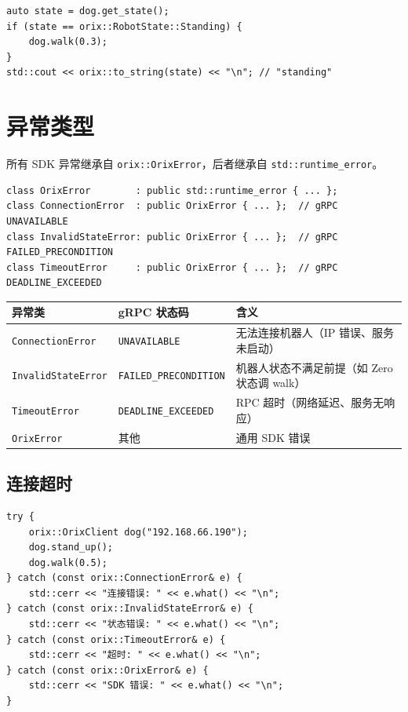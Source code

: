 \documentclass[a4paper,11pt,openany]{book}
\begin{document}
\begin{lstlisting}[style=cpp]
auto state = dog.get_state();
if (state == orix::RobotState::Standing) {
    dog.walk(0.3);
}
std::cout << orix::to_string(state) << "\n"; // "standing"
\end{lstlisting}

\section{异常类型}

所有 SDK 异常继承自 \texttt{orix::OrixError}，后者继承自 \texttt{std::runtime\_error}。

\begin{lstlisting}[style=cpp,numbers=none]
class OrixError        : public std::runtime_error { ... };
class ConnectionError  : public OrixError { ... };  // gRPC UNAVAILABLE
class InvalidStateError: public OrixError { ... };  // gRPC FAILED_PRECONDITION
class TimeoutError     : public OrixError { ... };  // gRPC DEADLINE_EXCEEDED
\end{lstlisting}

\begin{longtable}{lll}
\toprule
异常类 & gRPC 状态码 & 含义 \\
\midrule
\endhead
\texttt{ConnectionError} & \texttt{UNAVAILABLE} & 无法连接机器人（IP 错误、服务未启动）\\
\texttt{InvalidStateError} & \texttt{FAILED\_PRECONDITION} & 机器人状态不满足前提（如 Zero 状态调 walk）\\
\texttt{TimeoutError} & \texttt{DEADLINE\_EXCEEDED} & RPC 超时（网络延迟、服务无响应）\\
\texttt{OrixError} & 其他 & 通用 SDK 错误 \\
\bottomrule
\end{longtable}

\subsection{连接超时}

\begin{lstlisting}[style=cpp]
try {
    orix::OrixClient dog("192.168.66.190");
    dog.stand_up();
    dog.walk(0.5);
} catch (const orix::ConnectionError& e) {
    std::cerr << "连接错误: " << e.what() << "\n";
} catch (const orix::InvalidStateError& e) {
    std::cerr << "状态错误: " << e.what() << "\n";
} catch (const orix::TimeoutError& e) {
    std::cerr << "超时: " << e.what() << "\n";
} catch (const orix::OrixError& e) {
    std::cerr << "SDK 错误: " << e.what() << "\n";
}
\end{lstlisting}
\end{document}
